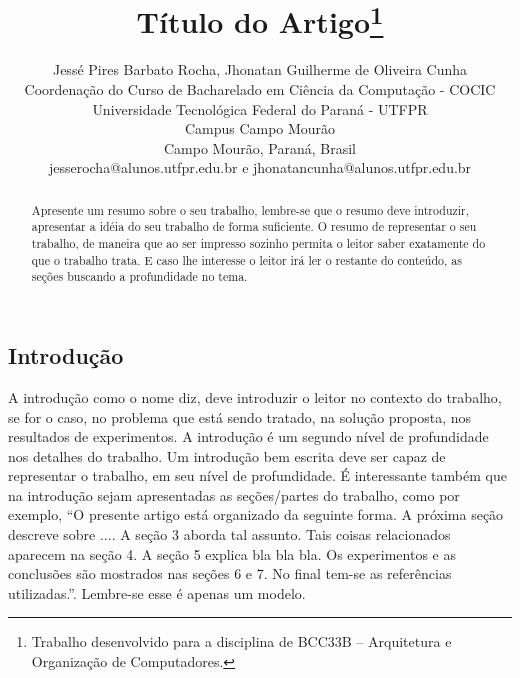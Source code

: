 \documentclass[times, 10pt,twocolumn]{article}
\begin{document}
\begin{savenotes}
\title{Título do Artigo\footnote{Trabalho desenvolvido para a disciplina de BCC33B – Arquitetura e Organização de Computadores.}}


\author{Jessé Pires Barbato Rocha, Jhonatan Guilherme de Oliveira Cunha\\
Coordenação do Curso de Bacharelado em Ciência da Computação - COCIC\\
Universidade Tecnológica Federal do Paraná - UTFPR\\ 
Campus Campo Mourão\\
Campo Mourão, Paraná, Brasil\\
jesserocha@alunos.utfpr.edu.br e jhonatancunha@alunos.utfpr.edu.br
\\
}

\maketitle
\thispagestyle{empty}

\begin{abstract}
   Apresente um resumo sobre o seu trabalho, lembre-se que o resumo deve introduzir, apresentar a idéia do seu trabalho de forma suficiente. O resumo de representar o seu trabalho, de maneira que ao ser impresso sozinho permita o leitor saber exatamente do que o trabalho trata. E caso lhe interesse o leitor irá ler o restante do conteúdo, as seções buscando a profundidade no tema.
\end{abstract}
\section{Introdução} \label{sec_introducao}

A introdução como o nome diz, deve introduzir o leitor no contexto do trabalho, se for o caso, no problema que está sendo tratado, na solução proposta, nos resultados de experimentos. A introdução é um segundo nível de profundidade nos detalhes do trabalho. Um introdução bem escrita deve ser capaz de representar o trabalho, em seu nível de profundidade. É interessante também que na introdução sejam apresentadas as seções/partes do trabalho, como por exemplo,  “O presente artigo está organizado da seguinte forma. A próxima seção descreve sobre .... A seção 3 aborda tal assunto. Tais coisas relacionados aparecem na seção 4. A seção 5 explica bla bla bla. Os experimentos e as conclusões são mostrados nas seções 6 e 7. No final tem-se as referências utilizadas.”. Lembre-se esse é apenas um modelo.

\end{savenotes}
\end{document}
